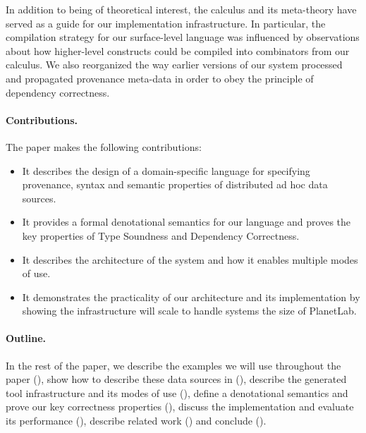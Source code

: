 In addition to being of theoretical interest, the calculus and its meta-theory
have served as a guide for our implementation infrastructure.  In particular,
the compilation strategy for our surface-level language was influenced by
observations about how higher-level constructs could be compiled into
combinators from our calculus.   We also reorganized the way 
earlier versions of our system processed and propagated provenance meta-data
in order to obey the principle of dependency correctness. 

\paragraph*{Contributions.} The paper makes the following
contributions:

\begin{itemize}
\item It describes the design of a
domain-specific language for specifying provenance, syntax and
semantic properties of distributed ad hoc data
sources.  

\item It provides a formal denotational semantics for our language
and proves the key properties of Type Soundness
and Dependency Correctness.

\item It describes the architecture of the system and how it
enables multiple modes of use.

\item It demonstrates the practicality of our architecture and its
  implementation by showing the infrastructure will scale to handle
  systems the size of PlanetLab.
\end{itemize}

\paragraph{Outline.}
In the rest of the paper, we describe the examples we will
use throughout the paper (), show how to describe
these data sources in \padsd{} (), describe
the generated tool infrastructure and its modes of use
(), define a denotational semantics and prove
our key correctness properties (),  
discuss the implementation and
evaluate its performance (), describe
related work () and conclude
(). 

